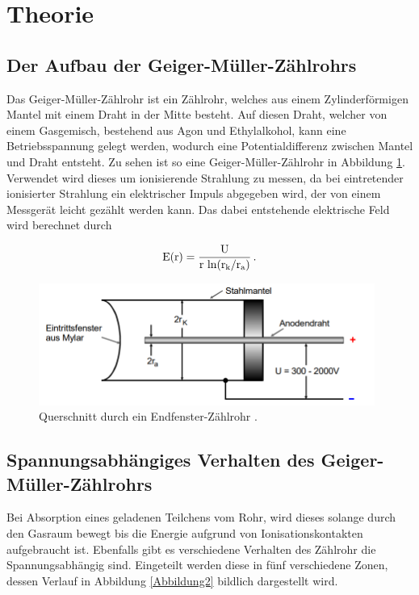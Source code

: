 \section{Theorie}

\subsection{Der Aufbau der Geiger-Müller-Zählrohrs}
\begin{flushleft}
    Das Geiger-Müller-Zählrohr ist ein Zählrohr, welches aus einem Zylinderförmigen Mantel mit einem Draht in der Mitte besteht.
    Auf diesen Draht, welcher von einem Gasgemisch, bestehend aus Agon und Ethylalkohol, kann eine Betriebsspannung gelegt werden, wodurch eine Potentialdifferenz zwischen Mantel und Draht entsteht.
    Zu sehen ist so eine Geiger-Müller-Zählrohr in Abbildung \ref{Abbildung1}.
    Verwendet wird dieses um ionisierende Strahlung zu messen, da bei eintretender ionisierter Strahlung ein elektrischer Impuls abgegeben wird, der von einem Messgerät leicht gezählt werden kann.
    Das dabei entstehende elektrische Feld wird berechnet durch 
\end{flushleft}

\begin{equation}
    \text{E}(\text{r}) = \frac{\text{U}}{\text{r}\,\ln(\text{r}_{\text{k}}/\text{r}_{\text{a}})}\,. \notag
\end{equation}

\begin{figure}[H]
    \centering
    \includegraphics[height=40mm]{bilder/Ab1.png}
    \caption{Querschnitt durch ein Endfenster-Zählrohr \cite{a1}. \label{Abbildung1} }
\end{figure}

\subsection{Spannungsabhängiges Verhalten des Geiger-Müller-Zählrohrs}

\begin{flushleft}
    Bei Absorption eines geladenen Teilchens vom Rohr, wird dieses solange durch den Gasraum bewegt bis die Energie aufgrund von Ionisationskontakten aufgebraucht ist.
    Ebenfalls gibt es verschiedene Verhalten des Zählrohr die Spannungsabhängig sind. 
    Eingeteilt werden diese in fünf verschiedene Zonen, dessen Verlauf in Abbildung \ref{Abbildung2} bildlich dargestellt wird.
\end{flushleft}

